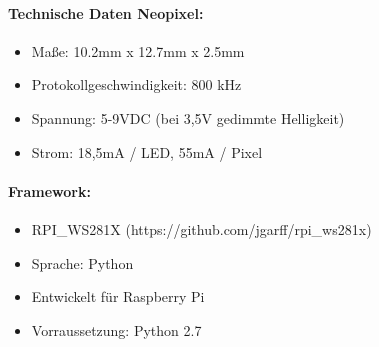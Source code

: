 \paragraph{Technische Daten Neopixel:} 
	\begin{itemize}
	\item Maße: 10.2mm x 12.7mm x 2.5mm
	\item Protokollgeschwindigkeit: 800 kHz
	\item Spannung: 5-9VDC  (bei 3,5V gedimmte Helligkeit) 
	\item Strom: 18,5mA / LED, 55mA / Pixel
	\end{itemize}
\paragraph{Framework:}
	\begin{itemize}
	\item RPI\_WS281X (https://github.com/jgarff/rpi\_ws281x)
	\item Sprache: Python
	\item Entwickelt für Raspberry Pi
	\item Vorraussetzung: Python 2.7
	\end{itemize}
